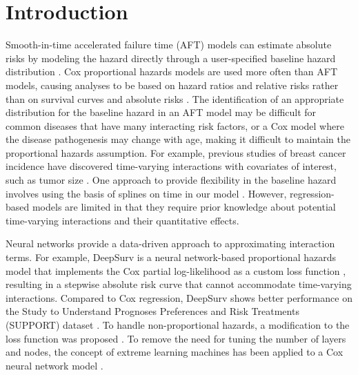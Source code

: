 \documentclass[APA,LATO1COL]{WileyNJD-v2}
\begin{document}



\maketitle




\hypertarget{introduction}{%
\section{Introduction}\label{introduction}}

Smooth-in-time accelerated failure time (AFT) models can estimate
absolute risks by modeling the hazard directly through a user-specified
baseline hazard distribution \citep{kleinbaum2012survival}. Cox
proportional hazards models are used more often than AFT models, causing
analyses to be based on hazard ratios and relative risks rather than on
survival curves and absolute risks \citep{hanley2009}. The
identification of an appropriate distribution for the baseline hazard in
an AFT model may be difficult for common diseases that have many
interacting risk factors, or a Cox model where the disease pathogenesis
may change with age, making it difficult to maintain the proportional
hazards assumption. For example, previous studies of breast cancer
incidence have discovered time-varying interactions with covariates of
interest, such as tumor size \citep{coradini2000time}. One approach to
provide flexibility in the baseline hazard involves using the basis of
splines on time in our model \citep{royston2002flexible}. However,
regression-based models are limited in that they require prior knowledge
about potential time-varying interactions and their quantitative
effects.

Neural networks provide a data-driven approach to approximating
interaction terms. For example, DeepSurv is a neural network-based
proportional hazards model that implements the Cox partial
log-likelihood as a custom loss function \citep{katzman2018DeepSurv},
resulting in a stepwise absolute risk curve that cannot accommodate
time-varying interactions. Compared to Cox regression, DeepSurv shows
better performance on the Study to Understand Prognoses Preferences and
Risk Treatments (SUPPORT) dataset \citep{knaus1995SUPPORT}. To handle
non-proportional hazards, a modification to the loss function was
proposed \citep{faraggi1995neural}. To remove the need for tuning the
number of layers and nodes, the concept of extreme learning machines has
been applied to a Cox neural network model \citep{wang2019extreme}.
\end{document}
